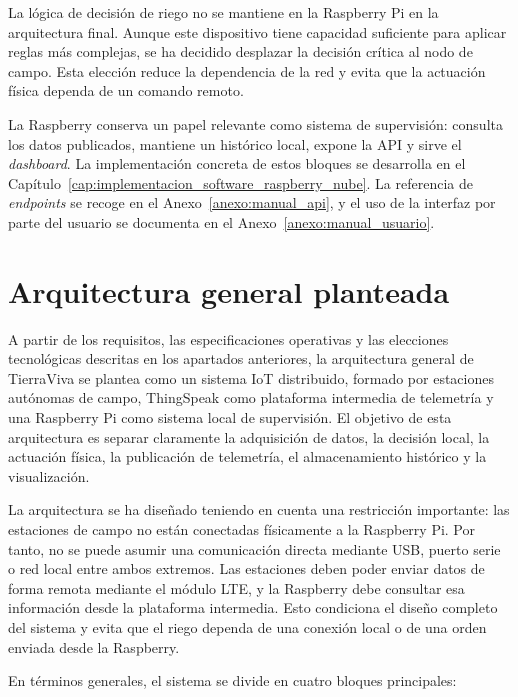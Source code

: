 La lógica de decisión de riego no se mantiene en la Raspberry Pi en la arquitectura final. Aunque este dispositivo tiene capacidad suficiente para aplicar reglas más complejas, se ha decidido desplazar la decisión crítica al nodo de campo. Esta elección reduce la dependencia de la red y evita que la actuación física dependa de un comando remoto.

La Raspberry conserva un papel relevante como sistema de supervisión: consulta los datos publicados, mantiene un histórico local, expone la API y sirve el \textit{dashboard}. La implementación concreta de estos bloques se desarrolla en el Capítulo~\ref{cap:implementacion_software_raspberry_nube}. La referencia de \textit{endpoints} se recoge en el Anexo~\ref{anexo:manual_api}, y el uso de la interfaz por parte del usuario se documenta en el Anexo~\ref{anexo:manual_usuario}.

\section{Arquitectura general planteada}
\label{sec:arquitectura_general_planteada}

A partir de los requisitos, las especificaciones operativas y las elecciones tecnológicas descritas en los apartados anteriores, la arquitectura general de TierraViva se plantea como un sistema IoT distribuido, formado por estaciones autónomas de campo, ThingSpeak como plataforma intermedia de telemetría y una Raspberry Pi como sistema local de supervisión. El objetivo de esta arquitectura es separar claramente la adquisición de datos, la decisión local, la actuación física, la publicación de telemetría, el almacenamiento histórico y la visualización.

La arquitectura se ha diseñado teniendo en cuenta una restricción importante: las estaciones de campo no están conectadas físicamente a la Raspberry Pi. Por tanto, no se puede asumir una comunicación directa mediante USB, puerto serie o red local entre ambos extremos. Las estaciones deben poder enviar datos de forma remota mediante el módulo LTE, y la Raspberry debe consultar esa información desde la plataforma intermedia. Esto condiciona el diseño completo del sistema y evita que el riego dependa de una conexión local o de una orden enviada desde la Raspberry.

En términos generales, el sistema se divide en cuatro bloques principales:

